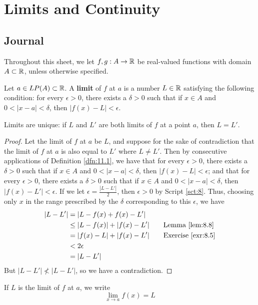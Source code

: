 \documentclass[../main.tex]{subfiles}
\begin{document}
\chapter{Limits and Continuity}\label{sct:11}
\section{Journal}
Throughout this sheet, we let $f,g:A\to\mathbb{R}$ be real-valued functions with domain $A\subset\mathbb{R}$, unless otherwise specified.
\begin{definition}\label{dfn:11.1}
    Let $a\in LP(A)\subset\mathbb{R}$. A \textbf{limit} of $f$ at $a$ is a number $L\in\mathbb{R}$ satisfying the following condition: for every $\epsilon>0$, there exists a $\delta>0$ such that if $x\in A$ and $0<|x-a|<\delta$, then $|f(x)-L|<\epsilon$.
\end{definition}

\begin{lemma}\label{lem:11.2}
    Limits are unique: if $L$ and $L'$ are both limits of $f$ at a point $a$, then $L=L'$.
    \begin{proof}
        Let the limit of $f$ at $a$ be $L$, and suppose for the sake of contradiction that the limit of $f$ at $a$ is also equal to $L'$ where $L\neq L'$. Then by consecutive applications of Definition \ref{dfn:11.1}, we have that for every $\epsilon>0$, there exists a $\delta>0$ such that if $x\in A$ and $0<|x-a|<\delta$, then $|f(x)-L|<\epsilon$; and that for every $\epsilon>0$, there exists a $\delta>0$ such that if $x\in A$ and $0<|x-a|<\delta$, then $|f(x)-L'|<\epsilon$. If we let $\epsilon=\frac{|L-L'|}{2}$, then $\epsilon>0$ by Script \ref{sct:8}. Thus, choosing only $x$ in the range prescribed by the $\delta$ corresponding to this $\epsilon$, we have
        \begin{align*}
            |L-L'| &= |L-f(x)+f(x)-L'|\\
            &\leq |L-f(x)|+|f(x)-L'|\tag*{Lemma \ref{lem:8.8}}\\
            &= |f(x)-L|+|f(x)-L'|\tag*{Exercise \ref{exr:8.5}}\\
            &< 2\epsilon\\
            &= |L-L'|
        \end{align*}
        But $|L-L'|\not<|L-L'|$, so we have a contradiction.
    \end{proof}
\end{lemma}

\begin{definition}\label{dfn:11.3}
    If $L$ is the limit of $f$ at $a$, we write
    \begin{equation*}
        \lim_{x\to a}f(x) = L
    \end{equation*}
\end{definition}
\end{document}
